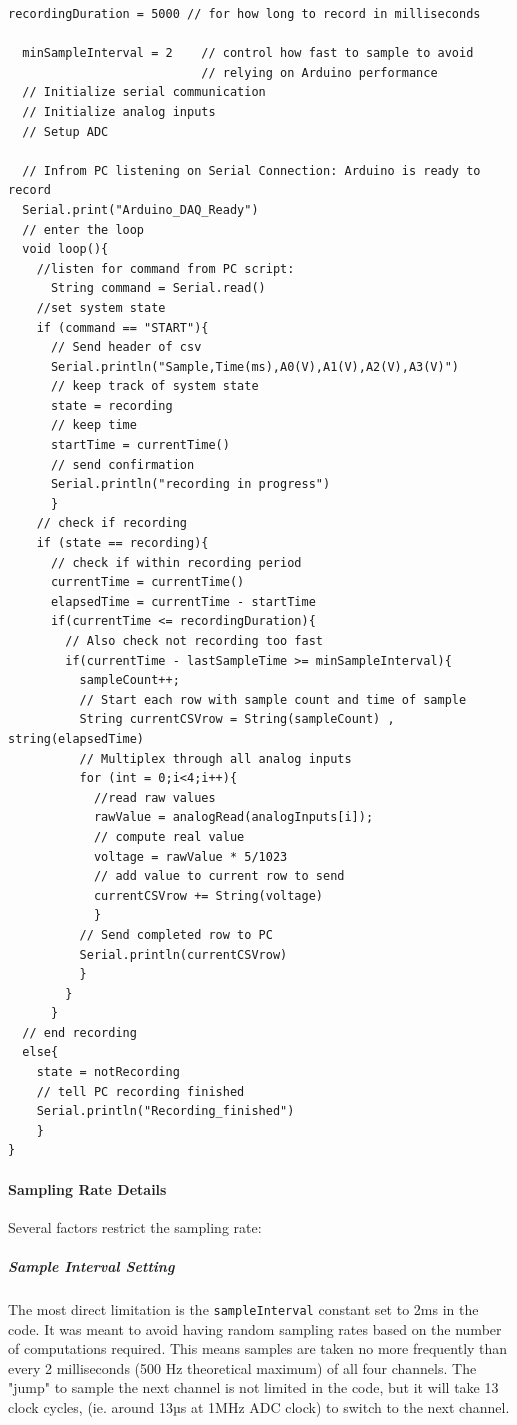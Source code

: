 \begin{lstlisting}[style=cstyle, caption=Arduino DAQ PseudoCode, label=lst:arduinoPseudoCode]
  recordingDuration = 5000 // for how long to record in milliseconds
  
  minSampleInterval = 2    // control how fast to sample to avoid
                           // relying on Arduino performance
  // Initialize serial communication
  // Initialize analog inputs
  // Setup ADC

  // Infrom PC listening on Serial Connection: Arduino is ready to record
  Serial.print("Arduino_DAQ_Ready")
  // enter the loop 
  void loop(){
    //listen for command from PC script:
      String command = Serial.read()
    //set system state
    if (command == "START"){
      // Send header of csv
      Serial.println("Sample,Time(ms),A0(V),A1(V),A2(V),A3(V)")
      // keep track of system state
      state = recording
      // keep time
      startTime = currentTime()
      // send confirmation
      Serial.println("recording in progress")
      }
    // check if recording
    if (state == recording){
      // check if within recording period
      currentTime = currentTime()
      elapsedTime = currentTime - startTime
      if(currentTime <= recordingDuration){
        // Also check not recording too fast  
        if(currentTime - lastSampleTime >= minSampleInterval){
          sampleCount++;
          // Start each row with sample count and time of sample
          String currentCSVrow = String(sampleCount) , string(elapsedTime)
          // Multiplex through all analog inputs 
          for (int = 0;i<4;i++){
            //read raw values
            rawValue = analogRead(analogInputs[i]);
            // compute real value
            voltage = rawValue * 5/1023
            // add value to current row to send
            currentCSVrow += String(voltage)
            }
          // Send completed row to PC
          Serial.println(currentCSVrow)
          }
        }
      }
  // end recording
  else{
    state = notRecording
    // tell PC recording finished
    Serial.println("Recording_finished")
    }
}
\end{lstlisting}

\paragraph{Sampling Rate Details}
Several factors restrict the sampling rate:

\subparagraph{Sample Interval Setting}
The most direct limitation is the \texttt{sampleInterval} constant set to 2ms in the code. It was meant to avoid having random sampling rates based on the number of computations required. This means samples are taken no more frequently than every 2 milliseconds (500 Hz theoretical maximum) of all four channels. The "jump" to sample the next channel is not limited in the code, but it will take 13 clock cycles, (ie. around 13µs at 1MHz ADC clock) to switch to the next channel.

